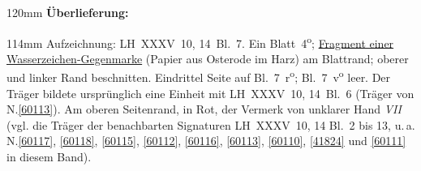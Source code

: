 
\begin{ledgroupsized}[r]{120mm}
\footnotesize
\pstart
\noindent\textbf{Überlieferung:}
\pend
\end{ledgroupsized}
\begin{ledgroupsized}[r]{114mm}
\footnotesize
\pstart \parindent -6mm
%
Aufzeichnung:
LH~XXXV~10, 14~Bl.~7. 
Ein Blatt~4\textsuperscript{o};
\href{\Scan{LH_35_10_14_007wz}}%
{Fragment einer Wasserzeichen-Gegenmarke} (Papier aus Osterode im Harz) 
am Blattrand;
oberer und linker Rand beschnitten. 
Eindrittel Seite auf Bl.~7~r\textsuperscript{o}; Bl.~7~v\textsuperscript{o} leer.
Der Träger bildete ursprünglich eine Einheit mit LH~XXXV~10, 14~Bl.~6 (Träger von N.\;\ref{60113}).
Am oberen Seitenrand, in Rot, der Vermerk von unklarer Hand \textit{VII}
(vgl. die Träger der benachbarten Signaturen LH~XXXV~10, 14 Bl.~2 bis 13, u.\,a. 
N.\;\ref{60117},
\ref{60118},
\ref{60115},
\ref{60112},
\ref{60116},
\ref{60113},
\ref{60110},
\ref{41824}
und \ref{60111}
in diesem Band).
\pend
\end{ledgroupsized}

